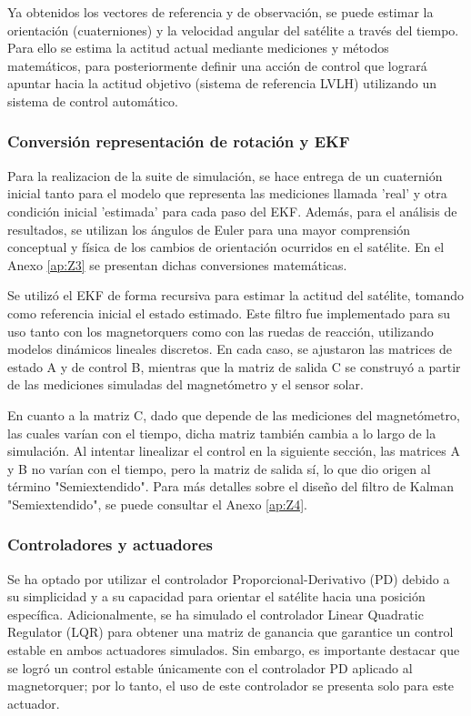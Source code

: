 Ya obtenidos los vectores de referencia y de observación, se puede estimar la orientación (cuaterniones) y la velocidad angular del satélite a través del tiempo. Para ello se estima la actitud actual mediante mediciones y métodos matemáticos, para posteriormente definir una acción de control que logrará apuntar hacia la actitud objetivo (sistema de referencia LVLH) utilizando un sistema de control automático.

\subsubsection{Conversión representación de rotación y \gls{EKF}}

Para la realizacion de la suite de simulación, se hace entrega de un cuaternión inicial tanto para el modelo que representa las mediciones llamada 'real' y otra condición inicial 'estimada' para cada paso del \gls{EKF}. Además, para el análisis de resultados, se utilizan los ángulos de Euler para una mayor comprensión conceptual y física de los cambios de orientación ocurridos en el satélite. En el Anexo \ref{ap:Z3} se presentan dichas conversiones matemáticas.

Se utilizó el \gls{EKF} de forma recursiva para estimar la actitud del satélite, tomando como referencia inicial el estado estimado. Este filtro fue implementado para su uso tanto con los magnetorquers como con las ruedas de reacción, utilizando modelos dinámicos lineales discretos. En cada caso, se ajustaron las matrices de estado A y de control B, mientras que la matriz de salida C se construyó a partir de las mediciones simuladas del magnetómetro y el sensor solar.

En cuanto a la matriz C, dado que depende de las mediciones del magnetómetro, las cuales varían con el tiempo, dicha matriz también cambia a lo largo de la simulación. Al intentar linealizar el control en la siguiente sección, las matrices A y B no varían con el tiempo, pero la matriz de salida sí, lo que dio origen al término "Semiextendido". Para más detalles sobre el diseño del filtro de Kalman "Semiextendido", se puede consultar el Anexo \ref{ap:Z4}.

\subsubsection{Controladores y actuadores}

Se ha optado por utilizar el controlador Proporcional-Derivativo (PD) debido a su simplicidad y a su capacidad para orientar el satélite hacia una posición específica. Adicionalmente, se ha simulado el controlador Linear Quadratic Regulator (LQR) para obtener una matriz de ganancia que garantice un control estable en ambos actuadores simulados. Sin embargo, es importante destacar que se logró un control estable únicamente con el controlador PD aplicado al magnetorquer; por lo tanto, el uso de este controlador se presenta solo para este actuador.

